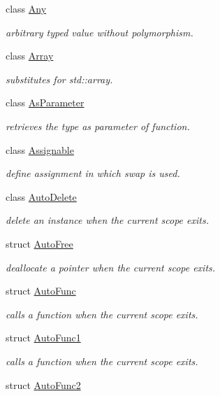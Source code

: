 \begin{DoxyCompactItemize}
class \hyperlink{classhryky_1_1_any}{Any}
\begin{DoxyCompactList}\small\item\em arbitrary typed value without polymorphism. \end{DoxyCompactList}\item 
class \hyperlink{classhryky_1_1_array}{Array}
\begin{DoxyCompactList}\small\item\em substitutes for std\-::array. \end{DoxyCompactList}\item 
class \hyperlink{classhryky_1_1_as_parameter}{As\-Parameter}
\begin{DoxyCompactList}\small\item\em retrieves the type as parameter of function. \end{DoxyCompactList}\item 
class \hyperlink{classhryky_1_1_assignable}{Assignable}
\begin{DoxyCompactList}\small\item\em define assignment in which swap is used. \end{DoxyCompactList}\item 
class \hyperlink{classhryky_1_1_auto_delete}{Auto\-Delete}
\begin{DoxyCompactList}\small\item\em delete an instance when the current scope exits. \end{DoxyCompactList}\item 
struct \hyperlink{structhryky_1_1_auto_free}{Auto\-Free}
\begin{DoxyCompactList}\small\item\em deallocate a pointer when the current scope exits. \end{DoxyCompactList}\item 
struct \hyperlink{structhryky_1_1_auto_func}{Auto\-Func}
\begin{DoxyCompactList}\small\item\em calls a function when the current scope exits. \end{DoxyCompactList}\item 
struct \hyperlink{structhryky_1_1_auto_func1}{Auto\-Func1}
\begin{DoxyCompactList}\small\item\em calls a function when the current scope exits. \end{DoxyCompactList}\item 
struct \hyperlink{structhryky_1_1_auto_func2}{Auto\-Func2}

\end{DoxyCompactItemize}
